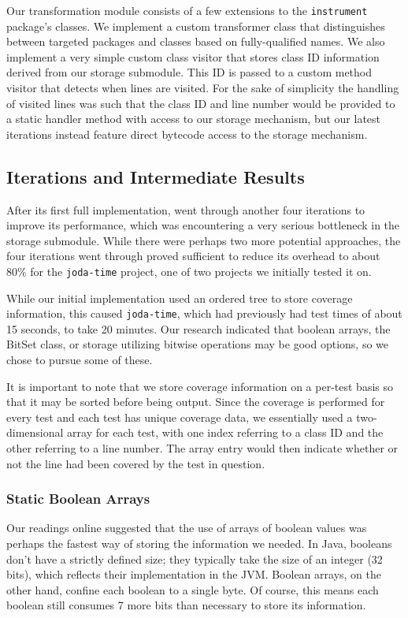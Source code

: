 Our transformation module consists of a few extensions to the \texttt{instrument} package's classes. We implement a custom transformer class that distinguishes between targeted packages and classes based on fully-qualified names. We also implement a very simple custom class visitor that stores class ID information derived from our storage submodule. This ID is passed to a custom method visitor that detects when lines are visited. For the sake of simplicity the handling of visited lines was such that the class ID and line number would be provided to a static handler method with access to our storage mechanism, but our latest iterations instead feature direct bytecode access to the storage mechanism.

\subsection{Iterations and Intermediate Results}

After its first full implementation, \ct{} went through another four iterations to improve its performance, which was encountering a very serious bottleneck in the storage submodule. While there were perhaps two more potential approaches, the four iterations \ct{} went through proved sufficient to reduce its overhead to about 80\% for the \texttt{joda-time} project, one of two projects we initially tested it on.

While our initial implementation used an ordered tree to store coverage information, this caused \texttt{joda-time}, which had previously had test times of about 15 seconds, to take 20 minutes. Our research indicated that boolean arrays, the BitSet class, or storage utilizing bitwise operations may be good options, so we chose to pursue some of these.

It is important to note that we store coverage information on a per-test basis so that it may be sorted before being output. Since the coverage is performed for every test and each test has unique coverage data, we essentially used a two-dimensional array for each test, with one index referring to a class ID and the other referring to a line number. The array entry would then indicate whether or not the line had been covered by the test in question.

\subsubsection{Static Boolean Arrays}

Our readings online suggested that the use of arrays of boolean values was perhaps the fastest way of storing the information we needed. In Java, booleans don't have a strictly defined size; they typically take the size of an integer (32 bits), which reflects their implementation in the JVM. Boolean arrays, on the other hand, confine each boolean to a single byte. Of course, this means each boolean still consumes 7 more bits than necessary to store its information.

